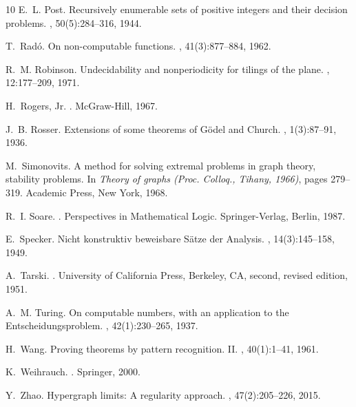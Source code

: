 \documentclass[10pt]{article}
\numberwithin{equation}{section}
\theoremstyle{definition}
\begin{document}
\begin{thebibliography}{10}
E.~L. Post.
\newblock Recursively enumerable sets of positive integers and their decision
  problems.
, 50(5):284--316, 1944.

T.~Rad{\'o}.
\newblock On non-computable functions.
, 41(3):877--884, 1962.

R.~M. Robinson.
\newblock Undecidability and nonperiodicity for tilings of the plane.
, 12:177--209, 1971.

H.~Rogers, Jr.
.
\newblock McGraw-Hill, 1967.

J.~B. Rosser.
\newblock Extensions of some theorems of {G}{\"o}del and {Church}.
, 1(3):87--91, 1936.

M.~Simonovits.
\newblock A method for solving extremal problems in graph theory, stability
  problems.
\newblock In {\em Theory of graphs (Proc. Colloq., Tihany, 1966)}, pages
  279--319. Academic Press, New York, 1968.

R.~I. Soare.
.
\newblock Perspectives in Mathematical Logic. Springer-Verlag, Berlin, 1987.

E.~Specker.
\newblock Nicht konstruktiv beweisbare {S}{\"a}tze der {Analysis}.
, 14(3):145--158, 1949.

A.~Tarski.
.
\newblock University of California Press, Berkeley, CA, second, revised
  edition, 1951.

A.~M. Turing.
\newblock On computable numbers, with an application to the
  {E}ntscheidungsproblem.
, 42(1):230--265, 1937.

H.~Wang.
\newblock Proving theorems by pattern recognition. {II}.
, 40(1):1--41, 1961.

K.~Weihrauch.
.
\newblock Springer, 2000.

Y.~Zhao.
\newblock Hypergraph limits: A regularity approach.
, 47(2):205--226, 2015.

\end{thebibliography}
\end{document}
